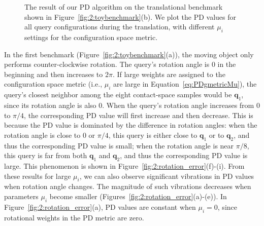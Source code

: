 \begin{figure}[!h]
\caption[Configuration space metric's influence on the result of our PD algorithm: translational benchmark]{The result of our PD algorithm on the translational benchmark shown in Figure~\ref{fig:2:toybenchmark}(b). We plot the PD values for all query configurations during the translation, with different $\mu_i$ settings for the configuration space metric.}\label{fig:2:translation_error}
\end{figure}


In the first benchmark (Figure~\ref{fig:2:toybenchmark}(a)), the moving object only performs counter-clockwise rotation. The query's rotation angle is $0$ in the beginning and then increases to $2\pi$. If large weights are assigned to the configuration space metric (i.e., $\mu_i$ are large in Equation~\ref{eq:PDgmetricMu}), the query's closest neighbor among the eight contact-space samples would be $\mathbf q_1$, since its rotation angle is also $0$. When the query's rotation angle increases from $0$ to $\pi/4$, the corresponding PD value will first increase and then decrease. This is because the PD value is dominated by the difference in rotation angles: when the rotation angle is close to $0$ or $\pi/4$, this query is either close to $\mathbf q_1$ or to $\mathbf q_2$, and thus the corresponding PD value is small; when the rotation angle is near $\pi/8$, this query is far from both $\mathbf q_1$ and $\mathbf q_2$, and thus the corresponding PD value is large. This phenomenon is shown in Figure~\ref{fig:2:rotation_error}(f)-(i). From these results for large $\mu_i$, we can also observe significant vibrations in PD values when rotation angle changes. The magnitude of such vibrations decreases when parameters $\mu_i$ become smaller (Figures~\ref{fig:2:rotation_error}(a)-(e)). In Figure~\ref{fig:2:rotation_error}(a), PD values are constant when $\mu_i = 0$, since rotational weights in the PD metric are zero.

